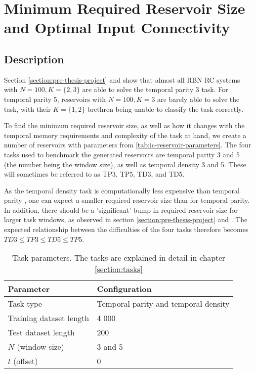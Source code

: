 \section{Minimum Required Reservoir Size and Optimal Input Connectivity}
\label{section:required_reservoir_size}

\subsection{Description}

Section \ref{section:pre-thesis-project} and \cite{burkow2015evolving}
show that almost all RBN RC systems with $N=100, K=\{2, 3\}$ are able to solve the temporal parity 3 task.
For temporal parity 5, reservoirs with $N=100, K=3$ are barely able to solve the task,
with their $K=\{1, 2\}$ brethren being unable to classify the task correctly.

To find the minimum required reservoir size, as well as how it changes with the temporal memory requirements and complexity of the task at hand,
we create a number of reservoirs with parameters from \ref{tab:ic-reservoir-parameters}.
The four tasks used to benchmark the generated reservoirs are temporal parity 3 and 5 (the number being the window size),
as well as temporal density 3 and 5.
These will sometimes be referred to as TP3, TP5, TD3, and TD5.

As the temporal density task is computationally less expensive than temporal parity \cite{rbn-reservoir},
one can expect a smaller required reservoir size than for temporal parity.
In addition, there should be a 'significant' bump in required reservoir size for larger task windows, as observed in section \ref{section:pre-thesis-project} and \cite{burkow2015evolving}.
The expected relationship between the difficulties of the four tasks therefore becomes $ TD3 \leq TP3 \leq TD5 \leq TP5 $.

\begin{table}[ht]
    \centering
    \caption{Task parameters. The tasks are explained in detail in chapter \ref{section:tasks}}
    \label{tab:tasks}
    \begin{tabular}{ll}
        \hline
        \textbf{Parameter} & \textbf{Configuration} \\
        \hline
        \hline
        Task type               & Temporal parity and temporal density \\
        Training dataset length & 4 000                       \\
        Test dataset length     & 200                         \\
        $N$ (window size)       & 3 and 5                     \\
        $t$ (offset)            & 0 \\
        \hline
    \end{tabular}
\end{table}

